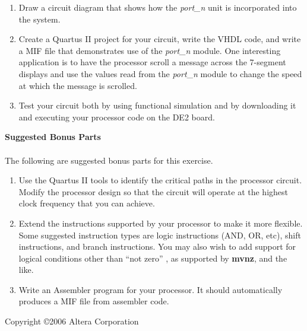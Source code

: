 \documentclass[epsfig,10pt,fullpage]{article}
\begin{document}
\begin{enumerate}
\item Draw a circuit diagram that shows how the {\it port\_n} unit is incorporated into the system.
\item Create a Quartus II project for your circuit, write the VHDL code, and write a MIF
file that demonstrates use of the {\it port\_n} module.
One interesting application is to have the processor scroll a message across 
the 7-segment displays and use
the values read from the {\it port}\_{\it n} module to change the speed at which the message
is scrolled.
\item Test your circuit both by using functional simulation and by downloading it and executing
your processor code on the DE2 board.
\end{enumerate}
\noindent
{\bf Suggested Bonus Parts}
~\\
~\\
\noindent
The following are suggested bonus parts for this exercise.
\begin{enumerate}
\item Use the Quartus II tools to identify the critical paths in the processor circuit.
Modify the processor design so that the circuit will operate at the highest clock
frequency that you can achieve.
\item Extend the instructions supported by your processor to make it more flexible. Some suggested
instruction types are logic instructions (AND, OR, etc), shift instructions, and branch
instructions. You may also wish to add support for logical conditions other than ``not zero''
, as supported by {\bf mvnz}, and the like.
\item Write an Assembler program for your processor. It should automatically produces a MIF file
from assembler code.
\end{enumerate}
Copyright \copyright 2006 Altera Corporation
\end{document}
